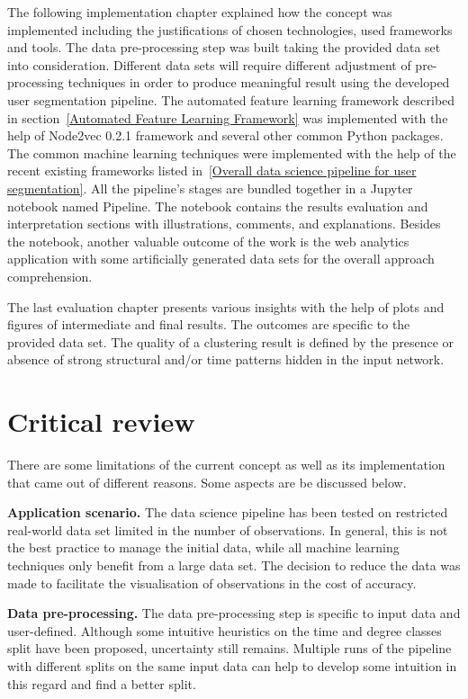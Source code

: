 The following implementation chapter explained how the concept was implemented including the justifications of chosen technologies, used frameworks and tools. The data pre-processing step was built taking the provided data set into consideration. Different data sets will require different adjustment of pre-processing techniques in order to produce meaningful result using the developed user segmentation pipeline. The automated feature learning framework described in section~\ref{Automated Feature Learning Framework} was implemented with the help of Node2vec 0.2.1 framework and several other common Python packages. The common machine learning techniques were implemented with the help of the recent existing frameworks listed in~\ref{Overall data science pipeline for user segmentation}. All the pipeline's stages are bundled together in a Jupyter notebook named Pipeline. The notebook contains the results evaluation and interpretation sections with illustrations, comments, and explanations. Besides the notebook, another valuable outcome of the work is the web analytics application with some artificially generated data sets for the overall approach comprehension.

The last evaluation chapter presents various insights with the help of plots and figures of intermediate and final results. The outcomes are specific to the provided data set. The quality of a clustering result is defined by the presence or absence of strong structural and/or time patterns hidden in the input network.

\section{Critical review}

There are some limitations of the current concept as well as its implementation that came out of different reasons. Some aspects are be discussed below.

\textbf{Application scenario.}
The data science pipeline has been tested on restricted real-world data set limited in the number of observations. In general, this is not the best practice to manage the initial data, while all machine learning techniques only benefit from a large data set. The decision to reduce the data was made to facilitate the visualisation of observations in the cost of accuracy.

\textbf{Data pre-processing.}
The data pre-processing step is specific to input data and user-defined. Although some intuitive heuristics on the time and degree classes split have been proposed, uncertainty still remains. Multiple runs of the pipeline with different splits on the same input data can help to develop some intuition in this regard and find a better split.

